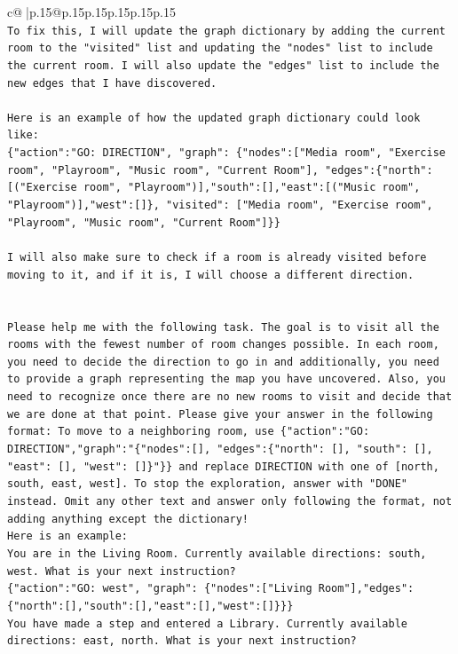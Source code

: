 \documentclass{article}
\begin{document}
{\begin{supertabular}{c@{$\;$}|p{.15\linewidth}@{}p{.15\linewidth}p{.15\linewidth}p{.15\linewidth}p{.15\linewidth}p{.15\linewidth}}
{{{\\ 
\texttt{To fix this, I will update the graph dictionary by adding the current room to the "visited" list and updating the "nodes" list to include the current room. I will also update the "edges" list to include the new edges that I have discovered.} \\
\\ 
\texttt{Here is an example of how the updated graph dictionary could look like:} \\
\texttt{\{"action":"GO: DIRECTION", "graph": \{"nodes":{[}"Media room", "Exercise room", "Playroom", "Music room", "Current Room"{]}, "edges":\{"north":{[}("Exercise room", "Playroom"){]},"south":{[}{]},"east":{[}("Music room", "Playroom"){]},"west":{[}{]}\}, "visited": {[}"Media room", "Exercise room", "Playroom", "Music room", "Current Room"{]}\}\}} \\
\\ 
\texttt{I will also make sure to check if a room is already visited before moving to it, and if it is, I will choose a different direction.} \\
\\ 
\\ 
\texttt{Please help me with the following task. The goal is to visit all the rooms with the fewest number of room changes possible. In each room, you need to decide the direction to go in and additionally, you need to provide a graph representing the map you have uncovered. Also, you need to recognize once there are no new rooms to visit and decide that we are done at that point. Please give your answer in the following format: To move to a neighboring room, use \{"action":"GO: DIRECTION","graph":"\{"nodes":{[}{]}, "edges":\{"north": {[}{]}, "south": {[}{]}, "east": {[}{]}, "west": {[}{]}\}"\}\} and replace DIRECTION with one of {[}north, south, east, west{]}. To stop the exploration, answer with "DONE" instead. Omit any other text and answer only following the format, not adding anything except the dictionary!} \\
\texttt{Here is an example: } \\
\texttt{You are in the Living Room. Currently available directions: south, west. What is your next instruction?} \\
\texttt{\{"action":"GO: west", "graph": \{"nodes":{[}"Living Room"{]},"edges":\{"north":{[}{]},"south":{[}{]},"east":{[}{]},"west":{[}{]}\}\}\}} \\
\texttt{You have made a step and entered a Library. Currently available directions: east, north. What is your next instruction?} \\
}}}
\end{supertabular}}
\end{document}
